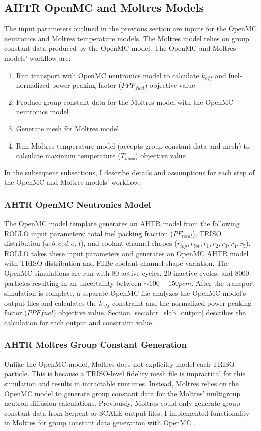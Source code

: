 \subsection{AHTR OpenMC and Moltres Models}
\label{sec:ahtr-moltres-hom}
The input parameters outlined in the previous section are inputs for 
the OpenMC neutronics and Moltres temperature models. 
The Moltres model relies on group constant data produced by the OpenMC model. 
The OpenMC and Moltres models' workflow are: 
\begin{enumerate}
\item Run transport with OpenMC neutronics model to calculate $k_{eff}$ and 
fuel-normalized power peaking factor ($PPF_{fuel}$) objective value
\item Produce group constant data for the Moltres model with the OpenMC neutronics model
\item Generate mesh for Moltres model
\item Run Moltres temperature model (accepts group constant data and mesh) to calculate 
maximum temperature ($T_{max}$) objective value
\end{enumerate}
In the subsequent subsections, I describe details and assumptions for each step of 
the OpenMC and Moltres models' workflow.

\subsubsection{AHTR OpenMC Neutronics Model}
The OpenMC model template generates an \gls{AHTR} model from the following \gls{ROLLO} 
input parameters: 
total fuel packing fraction ($PF_{total}$), TRISO distribution ($a, b, c, d, e, f$), 
and coolant channel shapes ($r_{top}, r_{bot}, r_1, r_2, r_3, r_4, r_5$).
\gls{ROLLO} takes these input parameters and generates an OpenMC AHTR model with 
TRISO distribution and FliBe coolant channel shape variation. 
The OpenMC simulations are run with 80 active cycles, 20 inactive cycles, and 8000 
particles resulting in an uncertainty between $\sim 100-150 pcm$.
After the transport simulation is complete, a separate OpenMC file analyzes 
the OpenMC model's output files and calculates the $k_{eff}$ constraint and the 
normalized power peaking factor ($PPF{fuel}$) objective value.
Section \ref{sec:ahtr_slab_output} describes the calculation for each output and 
constraint value.

\subsubsection{AHTR Moltres Group Constant Generation}
\label{sec:ahtr-moltres-group-constant-gen}
Unlike the OpenMC model, Moltres does not explicitly model each \gls{TRISO}
particle. 
This is because a TRISO-level fidelity mesh file is impractical for this simulation 
and results in intractable runtimes. 
Instead, Moltres relies on the OpenMC model to generate group constant data for the 
Moltres' multigroup neutron diffusion calculations. 
Previously, Moltres could only generate group constant data from Serpent 
\cite{leppanen_serpent_2014} or SCALE \cite{bucholz_scale:_1982} output files. 
I implemented functionality in Moltres for group constant data generation with 
OpenMC \cite{lindsay_moltres_2017}. 

